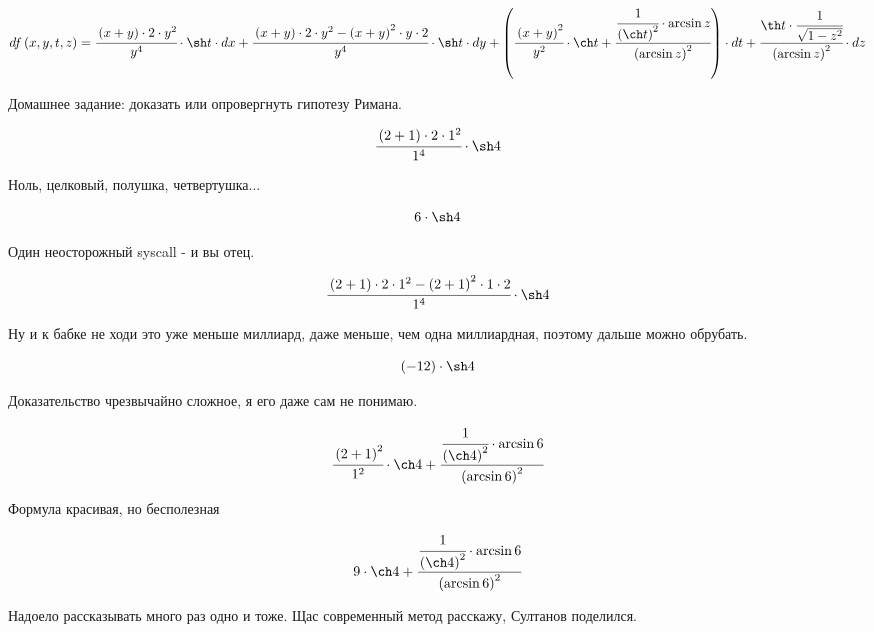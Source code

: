 \begin{dmath}
d f \left(  x,  y,  t,  z \right) = \cfrac{\left(x + y\right) \cdot 2 \cdot y^{2}}{y^{4}} \cdot \sh t \cdot d x  + \cfrac{\left(x + y\right) \cdot 2 \cdot y^{2} - \left(x + y\right)^{2} \cdot y \cdot 2}{y^{4}} \cdot \sh t \cdot d y  +  \left( \cfrac{\left(x + y\right)^{2}}{y^{2}} \cdot \ch t + \cfrac{\cfrac{1}{\left(\ch t\right)^{2}} \cdot \arcsin z}{\left(\arcsin z\right)^{2}} \right)  \cdot d t  + \cfrac{\th t \cdot \cfrac{1}{\sqrt{  1 - z^{2}}}}{\left(\arcsin z\right)^{2}} \cdot d z 
\end{dmath}


Домашнее задание: доказать или опровергнуть гипотезу Римана.


\begin{dmath}
\cfrac{\left(2 + 1\right) \cdot 2 \cdot 1^{2}}{1^{4}} \cdot \sh 4
\end{dmath}


Ноль, целковый, полушка, четвертушка...


\begin{dmath}
6 \cdot \sh 4
\end{dmath}


Один неосторожный syscall - и вы отец.


\begin{dmath}
\cfrac{\left(2 + 1\right) \cdot 2 \cdot 1^{2} - \left(2 + 1\right)^{2} \cdot 1 \cdot 2}{1^{4}} \cdot \sh 4
\end{dmath}


Ну и к бабке не ходи это уже меньше миллиард, даже меньше, чем одна миллиардная, поэтому дальше можно обрубать.


\begin{dmath}
(-12) \cdot \sh 4
\end{dmath}


Доказательство чрезвычайно сложное, я его даже сам не понимаю.


\begin{dmath}
\cfrac{\left(2 + 1\right)^{2}}{1^{2}} \cdot \ch 4 + \cfrac{\cfrac{1}{\left(\ch 4\right)^{2}} \cdot \arcsin 6}{\left(\arcsin 6\right)^{2}}
\end{dmath}


Формула красивая, но бесполезная


\begin{dmath}
9 \cdot \ch 4 + \cfrac{\cfrac{1}{\left(\ch 4\right)^{2}} \cdot \arcsin 6}{\left(\arcsin 6\right)^{2}}
\end{dmath}


Надоело рассказывать много раз одно и тоже. Щас современный метод расскажу, Султанов поделился.


